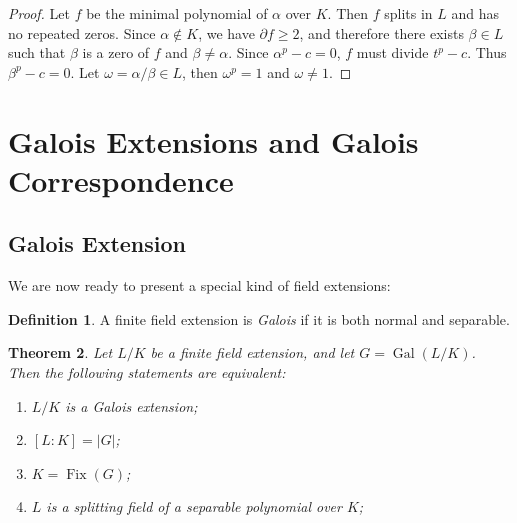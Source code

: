 \documentclass[12pt]{article}
\newtheorem{theorem}{Theorem}
\theoremstyle{definition}
\newtheorem{definition}[theorem]{Definition}
\newcommand{\Gal}{\operatorname{Gal}}
\newcommand{\Fix}{\operatorname{Fix}}
\begin{document}
\begin{proof}
	Let $f$ be the minimal polynomial of $\alpha$ over $K$. Then $f$ splits in $L$ and has no repeated zeros. Since $\alpha \notin K$, we have $\partial f \ge 2$, and therefore there exists $\beta \in L$ such that $\beta$ is a zero of $f$ and $\beta \neq \alpha$. Since $\alpha ^ p - c = 0$, $f$ must divide $t ^ p - c$. Thus $\beta^p - c = 0$. Let $\omega=\alpha / \beta \in L $, then $\omega^p=1$ and $\omega \neq 1$.
\end{proof}

\section{Galois Extensions and Galois Correspondence}

\subsection{Galois Extension}


We are now ready to present a special kind of field extensions:

\begin{definition}
    A finite field extension is \textit{Galois} if it is both normal and separable. 
\end{definition}


\begin{theorem} \label{thm:fixed}
	Let $L/K$ be a finite field extension, and let $G = \Gal(L/K)$. Then the following statements are equivalent:
	\begin{enumerate}[label=(\roman*)]
		\item $L/K$ is a Galois extension;
		\item $[L:K] = |G|$;
		\item $K = \Fix(G)$;
		\item $L$ is a splitting field of a separable polynomial over $K$;
	\end{enumerate}
\end{theorem}

\end{document}
